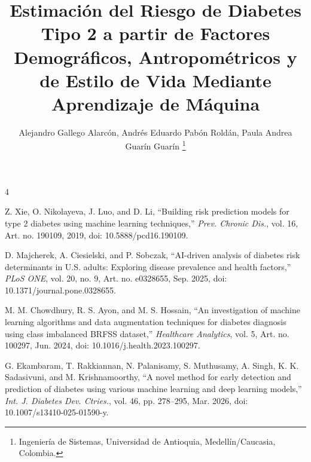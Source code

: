 \documentclass[journal]{IEEEtran}
\begin{document}
\title{Estimación del Riesgo de Diabetes Tipo 2 a partir de Factores Demográficos, Antropométricos y de Estilo de Vida Mediante Aprendizaje de Máquina}

\author{Alejandro Gallego Alarcón, Andrés Eduardo Pabón Roldán, Paula Andrea Guarín Guarín
\thanks{Ingeniería de Sistemas, Universidad de Antioquia, Medellín/Caucasia, Colombia.}}

\markboth{}{}

\maketitle







\begin{thebibliography}{4}

Z. Xie, O. Nikolayeva, J. Luo, and D. Li, ``Building risk prediction models for type 2 diabetes using machine learning techniques,'' \emph{Prev. Chronic Dis.}, vol. 16, Art. no. 190109, 2019, doi: 10.5888/pcd16.190109.

D. Majcherek, A. Ciesielski, and P. Sobczak, ``AI-driven analysis of diabetes risk determinants in U.S. adults: Exploring disease prevalence and health factors,'' \emph{PLoS ONE}, vol. 20, no. 9, Art. no. e0328655, Sep. 2025, doi: 10.1371/journal.pone.0328655.

M. M. Chowdhury, R. S. Ayon, and M. S. Hossain, ``An investigation of machine learning algorithms and data augmentation techniques for diabetes diagnosis using class imbalanced BRFSS dataset,'' \emph{Healthcare Analytics}, vol. 5, Art. no. 100297, Jun. 2024, doi: 10.1016/j.health.2023.100297.

G. Ekambaram, T. Rakkiannan, N. Palanisamy, S. Muthusamy, A. Singh, K. K. Sadasivuni, and M. Krishnamoorthy, ``A novel method for early detection and prediction of diabetes using various machine learning and deep learning models,'' \emph{Int. J. Diabetes Dev. Ctries.}, vol. 46, pp. 278--295, Mar. 2026, doi: 10.1007/s13410-025-01590-y.

\end{thebibliography}
\end{document}
